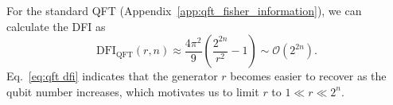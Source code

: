 \documentclass[reprint, aps, prl, superscriptaddress]{revtex4-2}
\newcommand{\myqc}{\text{HP}}
\newcommand{\fii}{\mathrm{DFI}}
\begin{document}










For the standard QFT (Appendix~\ref{app:qft_fisher_information}), we can calculate the DFI as
\begin{equation}
\label{eq:qft dfi}
    \fii_{\mathrm{QFT}}(r,n) \approx \frac{4\pi^2}{9}\left(\frac{2^{2n}}{r^2}-1\right) \sim \mathcal{O}\left(2^{2n}\right).
\end{equation} 
Eq.~\eqref{eq:qft dfi} indicates that the generator $r$ becomes easier to recover as the qubit number increases, which motivates us to limit $r$ to $1 \ll r \ll 2^n$. 

\end{document}
